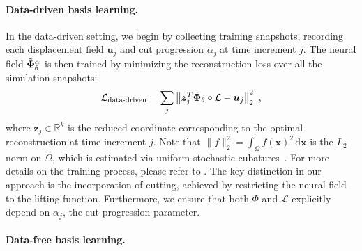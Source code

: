 \paragraph{Data-driven basis learning.} 
In the data-driven setting, we begin by collecting training snapshots, recording each displacement field $\bm{u}_j$ and cut progression $\alpha_j$ at time increment $j$. The neural field  $\Tilde{\bm{\Phi}}^\alpha_\theta$ is then trained by minimizing the reconstruction loss over all the simulation snapshots:
\begin{align}
\mathcal{L}_{\text{data-driven}} = \sum_{j} \left\| \bm{z}_j^T \Tilde{\bm{\Phi}}_\theta  \circ \mathcal{L}  - \bm{u}_j \right\|^2_2 \ ,
\end{align}
where  
$\bm{z}_j \in \mathbb{R}^k$ is the reduced coordinate corresponding to the optimal reconstruction 
at time increment $j$. Note that $\|f\|^2_2 = \int_\Omega f(\bm{x})^2 \,\mathrm{d}\bm{x}$ is the $L_2$ norm on $\Omega$,
which is estimated via uniform stochastic cubatures~\cite{An:Cubature:2008,carlberg2011model}.
For more details on the training process, please refer to \cite{chang:2023:licrom}. The key distinction in our approach is the incorporation of cutting, achieved by restricting the neural field to the lifting function. Furthermore, we ensure that both $\Phi$ and $\mathcal{L}$ explicitly depend on $\alpha_j$, the cut progression parameter.



\paragraph{Data-free basis learning.} 

